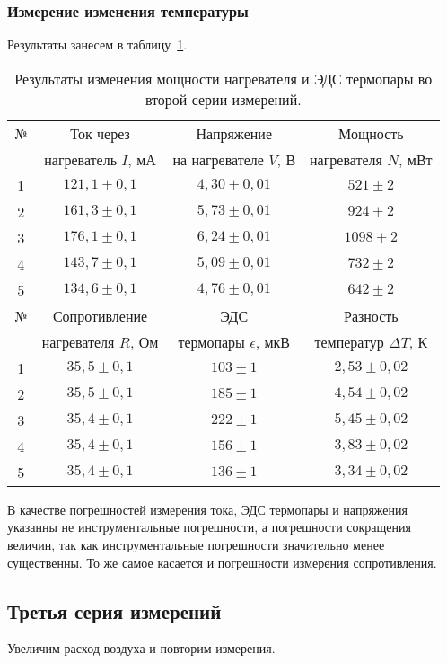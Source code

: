 \documentclass[a4paper,11pt]{article}
\begin{document}
\subsubsection{Измерение изменения температуры}
Результаты занесем в таблицу~\ref{table:tab4}.
\begin{table}[h!]
\centering
\begin{tabular}{ ||c|c|c|c|| }
  \hline
  № & Ток через & Напряжение & Мощность \\
   & нагреватель $I$, $мА$ & на нагревателе $V$, $В$ & нагревателя $N$, $мВт$ \\
  \hline
  1 & $121,1 \pm 0,1$ & $4,30 \pm 0,01$ & $521 \pm 2$ \\
  2 & $161,3 \pm 0,1$ & $5,73 \pm 0,01$ & $924 \pm 2$ \\
  3 & $176,1 \pm 0,1$ & $6,24 \pm 0,01$ & $1098 \pm 2$ \\
  4 & $143,7 \pm 0,1$ & $5,09 \pm 0,01$ & $732 \pm 2$ \\
  5 & $134,6 \pm 0,1$ & $4,76 \pm 0,01$ & $642 \pm 2$ \\
  \hline\hline
  № & Сопротивление & ЭДС & Разность \\
   & нагревателя $R$, $Ом$ & термопары $\epsilon$, $мкВ$ & температур $\Delta T$, $К$ \\
  \hline
  1 & $35,5 \pm 0,1$ & $103 \pm 1$ & $2,53 \pm 0,02$ \\
  2 & $35,5 \pm 0,1$ & $185 \pm 1$ & $4,54 \pm 0,02$ \\
  3 & $35,4 \pm 0,1$ & $222 \pm 1$ & $5,45 \pm 0,02$ \\
  4 & $35,4 \pm 0,1$ & $156 \pm 1$ & $3,83 \pm 0,02$ \\
  5 & $35,4 \pm 0,1$ & $136 \pm 1$ & $3,34 \pm 0,02$ \\
  \hline
\end{tabular}
\caption{Результаты изменения мощности нагревателя и ЭДС термопары во второй серии измерений.}
\label{table:tab4}
\end{table}
\newline
В качестве погрешностей измерения тока, ЭДС термопары и напряжения указанны не инструментальные погрешности, а погрешности сокращения величин, так как инструментальные погрешности значительно менее существенны. То же самое касается и погрешности измерения сопротивления.
\subsection{Третья серия измерений}
Увеличим расход воздуха и повторим измерения.
\end{document}
